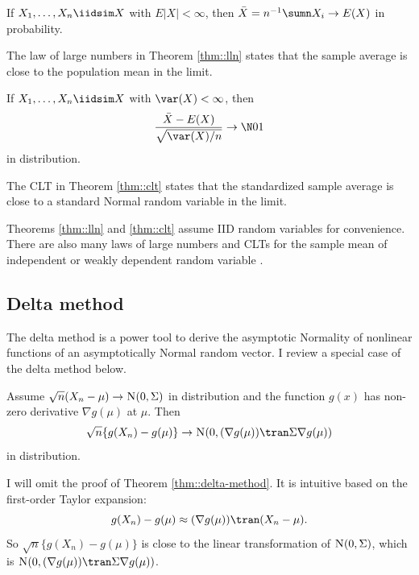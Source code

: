 \begin{theorem}
\label{thm::lln}
If $X_1,\ldots, X_n \iidsim X$ with $E| X| <\infty$, then $\bar{X} = n^{-1} \sumn X_i \rightarrow E(X)$ in probability. 
\end{theorem}


The law of large numbers in Theorem \ref{thm::lln} states that the sample average is close to the population mean in the limit. 

\begin{theorem}
\label{thm::clt}
If $X_1,\ldots, X_n \iidsim X$ with $\var (X) <\infty$, then 
$$ 
\frac{   \bar{X} - E(X)   }
{ \sqrt{ \var (X) /n    } } \rightarrow \N01
$$  
in distribution. 
\end{theorem}

The CLT in Theorem \ref{thm::clt} states that the standardized sample average is close to a standard Normal random variable in the limit. 


Theorems \ref{thm::lln} and \ref{thm::clt} assume IID random variables for convenience. 
There are also many laws of large numbers and CLTs for the sample mean of independent or weakly dependent random variable \citep[e.g.,][]{durrett2019probability}. 




\subsection{Delta method}\label{section::delta-method}


The delta method is a power tool to derive the asymptotic Normality of nonlinear functions of an asymptotically Normal random vector. I review a special case of the delta method below.


\begin{theorem}
\label{thm::delta-method}
Assume $\sqrt{n} (X_n - \mu) \rightarrow \textsc{N}(0, \Sigma)$ in distribution and the function $g(x)$ has non-zero derivative $ \nabla g(\mu)   $ at $\mu$. Then
$$
\sqrt{n} \{  g(X_n) - g(\mu) \}  \rightarrow \textsc{N} (0,   (\nabla g(\mu) ) \tran  \Sigma \nabla g(\mu)  )
$$
in distribution.
\end{theorem}  

I will omit the proof of Theorem \ref{thm::delta-method}. It is intuitive based on the first-order Taylor expansion:
$$
g(X_n) - g(\mu) \approx  (\nabla g(\mu) ) \tran  (X_n - \mu) .
$$
So $\sqrt{n} \{  g(X_n) - g(\mu) \} $ is close to the linear transformation of $\textsc{N}(0, \Sigma)$, which is $\textsc{N} (0,   (\nabla g(\mu) ) \tran  \Sigma \nabla g(\mu)  )$. 




